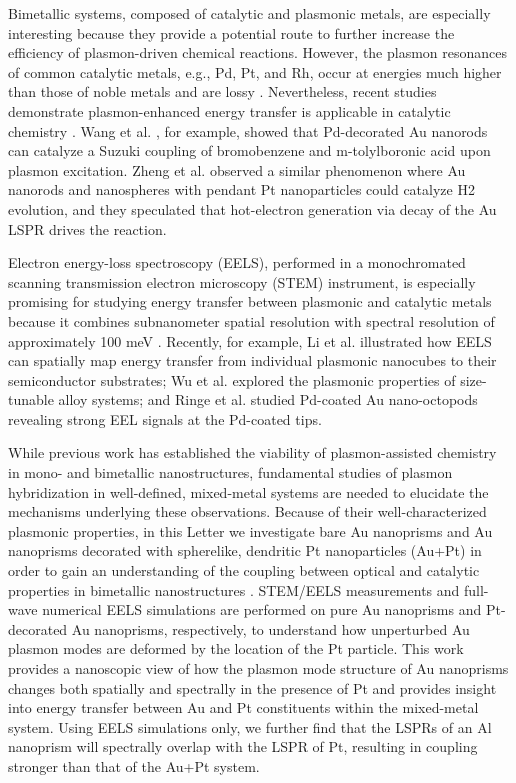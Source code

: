 \documentclass [11pt, proquest] {uwthesis}[2016/11/22]
\begin{document}
Bimetallic systems, composed of catalytic and plasmonic metals, are especially interesting because they provide a potential route to further increase the efficiency of plasmon-driven chemical reactions. However, the plasmon resonances of common catalytic metals, e.g., Pd, Pt, and Rh, occur at energies much higher than those of noble metals and are lossy \cite{Weaver}. Nevertheless, recent studies demonstrate plasmon-enhanced energy transfer is applicable in catalytic chemistry \cite{LinicCharge,LinicDominant,RingeHetero}. Wang et al. \cite{YanSuzuki}, for example, showed that Pd-decorated Au nanorods can catalyze a Suzuki coupling of bromobenzene and m-tolylboronic acid upon plasmon excitation. Zheng et al. \cite{PtAuRods} observed a similar phenomenon where Au nanorods and nanospheres with pendant Pt nanoparticles could catalyze H2 evolution, and they speculated that hot-electron generation via decay of the Au LSPR drives the reaction.

Electron energy-loss spectroscopy (EELS), performed in a monochromated scanning transmission electron microscopy (STEM) instrument, is especially promising for studying energy transfer between plasmonic and catalytic metals because it combines subnanometer spatial resolution with spectral resolution of approximately 100 meV \cite{ARPC}. Recently, for example, Li et al. \cite{CubeSubstrate} illustrated how EELS can spatially map energy transfer from individual plasmonic nanocubes to their semiconductor substrates; Wu et al. \cite{Alloys} explored the plasmonic properties of size-tunable alloy systems; and Ringe et al. \cite{RingeTips} studied Pd-coated Au nano-octopods revealing strong EEL signals at the Pd-coated tips.

While previous work has established the viability of plasmon-assisted chemistry in mono- and bimetallic nanostructures, fundamental studies of plasmon hybridization in well-defined, mixed-metal systems are needed to elucidate the mechanisms underlying these observations. Because of their well-characterized plasmonic properties, in this Letter we investigate bare Au nanoprisms and Au nanoprisms decorated with spherelike, dendritic Pt nanoparticles (Au+Pt) in order to gain an understanding of the coupling between optical and catalytic properties in bimetallic nanostructures \cite{MillstoneSeedless,MillstonePtAu}. STEM/EELS measurements and full-wave numerical EELS simulations are performed on pure Au nanoprisms and Pt-decorated Au nanoprisms, respectively, to understand how unperturbed Au plasmon modes are deformed by the location of the Pt particle. This work provides a nanoscopic view of how the plasmon mode structure of Au nanoprisms changes both spatially and spectrally in the presence of Pt and provides insight into energy transfer between Au and Pt constituents within the mixed-metal system. Using EELS simulations only, we further find that the LSPRs of an Al nanoprism will spectrally overlap with the LSPR of Pt, resulting in coupling stronger than that of the Au+Pt system.
\end{document}
